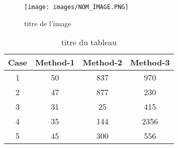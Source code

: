 \begin{figure}[H] 
    \centering
    \caption{titre de l'image} 
    \texttt{[image: images/NOM\_IMAGE.PNG]} %
    \label{fig1} 
\end{figure}

\begin{table}[ht] %
    \caption{titre du tableau} %
    \centering %
        \begin{tabular}{c c c c} %
            \hline\hline %
            Case & Method-1 & Method-2 & Method-3 \\ [0.5ex] %
            \hline %
            1 & 50 & 837 & 970 \\ %
            2 & 47 & 877 & 230 \\
            3 & 31 & 25 & 415 \\
            4 & 35 & 144 & 2356 \\
            5 & 45 & 300 & 556 \\ [1ex] %
            \hline %
        \end{tabular} %
    \label{tab1} %
\end{table} %






